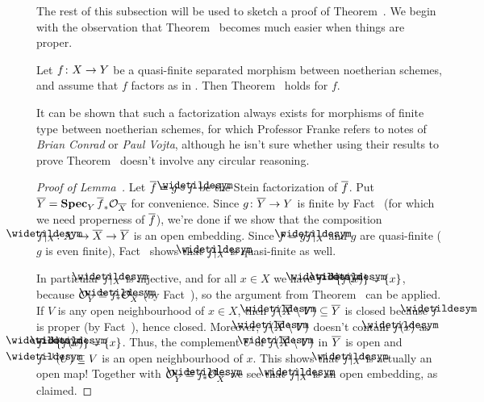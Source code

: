 \documentclass[a4paper,parskip=half,numbers=enddot, DIV=12]{scrreprt}
\begin{document}
	The rest of this subsection will be used to sketch a proof of Theorem~. We begin with the observation that Theorem~ becomes much easier when things are proper.
	\begin{lem}
		Let $f\colon X\morphism Y$ be a quasi-finite separated morphism between noetherian schemes, and assume that $f$ factors as in . Then Theorem~ holds for $f$.
	\end{lem}
\begin{rem}
	 It can be shown that such a factorization  always exists for morphisms of finite type between noetherian schemes, for which Professor Franke refers to notes of \emph{Brian Conrad} or \emph{Paul Vojta}, although he isn't sure whether using their results to prove Theorem~ doesn't involve any circular reasoning.
\end{rem}
\begin{proof}[Proof of Lemma~]
	Let $\ov{f}=g\circ \snake{f}$ be the Stein factorization of $\overline{f}$. Put $\overline{Y}=\operatorname{\mathbf{Spec}}_Y\overline{f}_*\mathcal{O}_{\overline{X}}$ for convenience. Since $g\colon \ov{Y}\morphism Y$ is finite by Fact~ (for which we need properness of $\overline{f}$), we're done if we show that the composition $\snake{f}|_X\colon X\monomorphism \ov{X}\morphism \ov{Y}$ is an open embedding. Since $f=g\snake{f}|_X$ and $g$ are quasi-finite ($g$ is even finite), Fact~ shows that $\snake{f}|_X$ is quasi-finite as well.
	
	In particular $\snake{f}|_X$ is injective, and for all $x\in X$ we have $\snake{f}^{-1}\{\snake{f}(x)\}=\{x\}$, because $\Oo_{\ov{Y}}\cong \snake{f}_*\Oo_{\ov{X}}$ (by Fact~), so the argument from Theorem~ can be applied. If $V$ is any open neighbourhood of $x\in X$, then $\snake{f}(\ov{X}\setminus V)\subseteq \ov{Y}$ is closed because $\snake{f}$ is proper (by Fact~), hence closed. Moreover, $\snake{f}(\ov{X}\setminus V)$ doesn't contain $\snake{f}(x)$ as $\snake{f}^{-1}\{\snake{f}(x)\}=\{x\}$. Thus, the complement $U$ of $\snake{f}(\ov{X}\setminus V)$ in $\overline{Y}$ is open and $\snake{f}^{-1}(U)\subseteq V$ is an open neighbourhood of $x$. This shows that $\snake{f}|_X$ is actually an open map! Together with $\Oo_{\ov{Y}}\cong \snake{f}_*\Oo_{\ov{X}}$ we see that $\snake{f}|_X$ is an open embedding, as claimed.
\end{proof}
\end{document}
